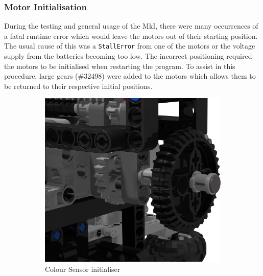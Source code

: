 \documentclass{report}
\newcommand{\legopiece}[1]{(\##1)}
\begin{document}
	\subsubsection{Motor Initialisation}
	
	During the testing and general usage of the MkI, there were many occurrences of a fatal runtime error which would leave the motors out of their starting position. The usual cause of this was a \lstinline|StallError| from one of the motors or the voltage supply from the batteries becoming too low. The incorrect positioning required the motors to be initialised when restarting the program. To assist in this procedure, large gears \legopiece{32498} were added to the motors which allows them to be returned to their respective initial positions.
	
	\begin{figure}[H]
		\centering
		\begin{subfigure}[b]{0.25\textwidth}
			\includegraphics[width=\textwidth]{Resources/Images/rdrInitialiser1.png}
			\caption{Colour Sensor initialiser}
			\label{fig:rdrInitialiser1}
		\end{subfigure}
		\hspace{10mm}
		\begin{subfigure}[b]{0.25\textwidth}

\end{subfigure}
\end{figure}
\end{document}
